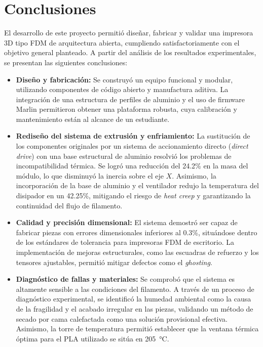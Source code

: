 \section{Conclusiones}

El desarrollo de este proyecto permitió diseñar, fabricar y validar una 
impresora 3D tipo FDM de arquitectura abierta, cumpliendo satisfactoriamente 
con el objetivo general planteado. A partir del análisis de los resultados 
experimentales, se presentan las siguientes conclusiones:

\begin{itemize}
    \item \textbf{Diseño y fabricación:} Se construyó un equipo funcional y 
    modular, utilizando componentes de código abierto y manufactura aditiva. 
    La integración de una estructura de perfiles de aluminio y el uso de 
    firmware Marlin permitieron obtener una plataforma robusta, cuya 
    calibración y mantenimiento están al alcance de un estudiante.

    \item \textbf{Rediseño del sistema de extrusión y enfriamiento:} La 
    sustitución de los componentes originales por un sistema de accionamiento 
    directo (\textit{direct drive}) con una base estructural de aluminio 
    resolvió los problemas de incompatibilidad térmica. Se logró una reducción 
    del 24.2\% en la masa del módulo, lo que disminuyó la inercia sobre el 
    eje \(X\). Asimismo, la incorporación de la base de aluminio y el 
    ventilador redujo la temperatura del disipador en un 42.25\%, mitigando 
    el riesgo de \textit{heat creep} y garantizando la continuidad del flujo 
    de filamento.

    \item \textbf{Calidad y precisión dimensional:} El sistema demostró ser 
    capaz de fabricar piezas con errores dimensionales inferiores al 0.3\%, 
    situándose dentro de los estándares de tolerancia para impresoras FDM de 
    escritorio. La implementación de mejoras estructurales, como las escuadras 
    de refuerzo y los tensores ajustables, permitió mitigar defectos como el 
    \textit{ghosting}.

    \item \textbf{Diagnóstico de fallas y materiales:} Se comprobó que el 
    sistema es altamente sensible a las condiciones del filamento. A través 
    de un proceso de diagnóstico experimental, se identificó la humedad 
    ambiental como la causa de la fragilidad y el acabado irregular en las 
    piezas, validando un método de secado por cama calefactada como una 
    solución provisional efectiva. Asimismo, la torre de temperatura permitió 
    establecer que la ventana térmica óptima para el PLA utilizado se sitúa 
    en \qty{205}{\celsius}.


\end{itemize}
